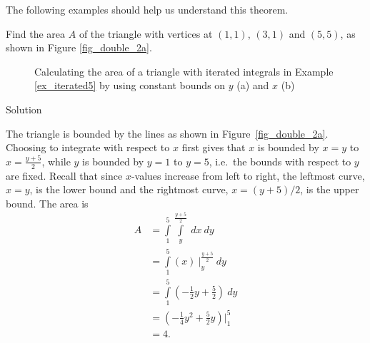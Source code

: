 The following examples should help us understand this theorem.


\begin{example}\label{ex_iterated5}
Find the area $A$ of the triangle with vertices at $(1,1)$, $(3,1)$ and $(5,5)$, as shown in Figure \ref{fig_double_2a}.



\begin{figure}[H]
\centering
\qquad
{}
\caption{Calculating the area of a triangle with iterated integrals in Example \ref{ex_iterated5} by using constant bounds on $y$ (a) and $x$ (b) }
\end{figure}




Solution 

The triangle is bounded by the lines as shown in  Figure~\ref{fig_double_2a}. Choosing to integrate with respect to $x$ first gives that $x$ is bounded by $x=y$ to $x = \frac{y+5}2$, while $y$ is bounded by $y=1$ to $y=5$, i.e.\ the bounds with respect to $y$ are fixed. Recall that since $x$-values increase from left to right, the leftmost curve, $x=y$, is the lower bound and the rightmost curve, $x=(y+5)/2$, is the upper bound. The area is
\allowdisplaybreaks
\begin{align*}
A &= \int\limits_1^5\int\limits_{y}^{\frac{y+5}2}\ dx\ dy \\
 &= \int\limits_1^5\left(x\right)\ \Big|_y^{\frac{y+5}2}\ dy \\
&= \int\limits_1^5 \left(-\frac12y+\frac52\right)\ dy \\
&= \left(-\frac14y^2+\frac52y\right)\Bigg|_1^5\\
&=4.
\end{align*}


\end{example}

